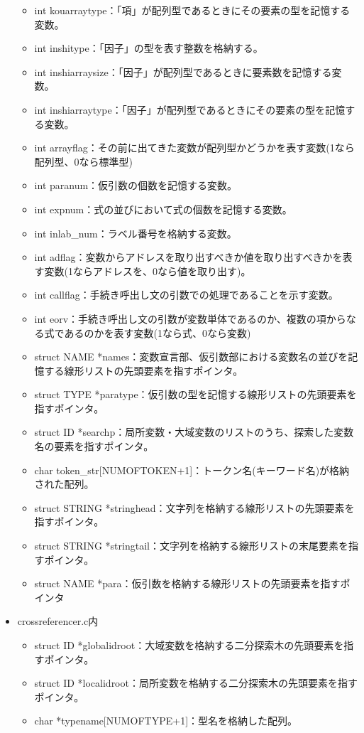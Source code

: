 \documentclass{jarticle}
\begin{document}
\begin{itemize}
\begin{itemize}
    \item int kouarraytype：「項」が配列型であるときにその要素の型を記憶する変数。
    \item int inshitype：「因子」の型を表す整数を格納する。
    \item int inshiarraysize：「因子」が配列型であるときに要素数を記憶する変数。
    \item int inshiarraytype：「因子」が配列型であるときにその要素の型を記憶する変数。
    \item int arrayflag：その前に出てきた変数が配列型かどうかを表す変数(1なら配列型、0なら標準型)
    \item int paranum：仮引数の個数を記憶する変数。
    \item int expnum：式の並びにおいて式の個数を記憶する変数。
    \item int inlab\_num：ラベル番号を格納する変数。
    \item int adflag：変数からアドレスを取り出すべきか値を取り出すべきかを表す変数(1ならアドレスを、0なら値を取り出す)。
    \item int callflag：手続き呼出し文の引数での処理であることを示す変数。
    \item int eorv：手続き呼出し文の引数が変数単体であるのか、複数の項からなる式であるのかを表す変数(1なら式、0なら変数)
    \item struct NAME *names：変数宣言部、仮引数部における変数名の並びを記憶する線形リストの先頭要素を指すポインタ。
    \item struct TYPE *paratype：仮引数の型を記憶する線形リストの先頭要素を指すポインタ。
    \item struct ID *searchp：局所変数・大域変数のリストのうち、探索した変数名の要素を指すポインタ。
    \item char token\_str[NUMOFTOKEN+1]：トークン名(キーワード名)が格納された配列。
    \item struct STRING *stringhead：文字列を格納する線形リストの先頭要素を指すポインタ。
    \item struct STRING *stringtail：文字列を格納する線形リストの末尾要素を指すポインタ。
    \item struct NAME *para：仮引数を格納する線形リストの先頭要素を指すポインタ
  \end{itemize}
  \item crossreferencer.c内
  \begin{itemize}
    \item struct ID *globalidroot：大域変数を格納する二分探索木の先頭要素を指すポインタ。
    \item struct ID *localidroot：局所変数を格納する二分探索木の先頭要素を指すポインタ。
    \item char *typename[NUMOFTYPE+1]：型名を格納した配列。
  \end{itemize}
\end{itemize}
\end{document}
